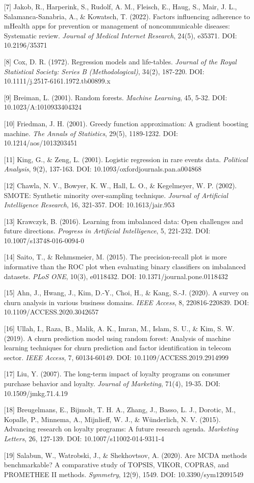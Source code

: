 \documentclass[
  12pt,
]{ctexart}
\begin{document}
{[}7{]} Jakob, R., Harperink, S., Rudolf, A. M., Fleisch, E., Haug, S., Mair, J. L., Salamanca-Sanabria, A., \& Kowatsch, T. (2022). Factors influencing adherence to mHealth apps for prevention or management of noncommunicable diseases: Systematic review. \emph{Journal of Medical Internet Research}, 24(5), e35371. DOI: 10.2196/35371

{[}8{]} Cox, D. R. (1972). Regression models and life-tables. \emph{Journal of the Royal Statistical Society: Series B (Methodological)}, 34(2), 187-220. DOI: 10.1111/j.2517-6161.1972.tb00899.x

{[}9{]} Breiman, L. (2001). Random forests. \emph{Machine Learning}, 45, 5-32. DOI: 10.1023/A:1010933404324

{[}10{]} Friedman, J. H. (2001). Greedy function approximation: A gradient boosting machine. \emph{The Annals of Statistics}, 29(5), 1189-1232. DOI: 10.1214/aos/1013203451

{[}11{]} King, G., \& Zeng, L. (2001). Logistic regression in rare events data. \emph{Political Analysis}, 9(2), 137-163. DOI: 10.1093/oxfordjournals.pan.a004868

{[}12{]} Chawla, N. V., Bowyer, K. W., Hall, L. O., \& Kegelmeyer, W. P. (2002). SMOTE: Synthetic minority over-sampling technique. \emph{Journal of Artificial Intelligence Research}, 16, 321-357. DOI: 10.1613/jair.953

{[}13{]} Krawczyk, B. (2016). Learning from imbalanced data: Open challenges and future directions. \emph{Progress in Artificial Intelligence}, 5, 221-232. DOI: 10.1007/s13748-016-0094-0

{[}14{]} Saito, T., \& Rehmsmeier, M. (2015). The precision-recall plot is more informative than the ROC plot when evaluating binary classifiers on imbalanced datasets. \emph{PLoS ONE}, 10(3), e0118432. DOI: 10.1371/journal.pone.0118432

{[}15{]} Ahn, J., Hwang, J., Kim, D.-Y., Choi, H., \& Kang, S.-J. (2020). A survey on churn analysis in various business domains. \emph{IEEE Access}, 8, 220816-220839. DOI: 10.1109/ACCESS.2020.3042657

{[}16{]} Ullah, I., Raza, B., Malik, A. K., Imran, M., Islam, S. U., \& Kim, S. W. (2019). A churn prediction model using random forest: Analysis of machine learning techniques for churn prediction and factor identification in telecom sector. \emph{IEEE Access}, 7, 60134-60149. DOI: 10.1109/ACCESS.2019.2914999

{[}17{]} Liu, Y. (2007). The long-term impact of loyalty programs on consumer purchase behavior and loyalty. \emph{Journal of Marketing}, 71(4), 19-35. DOI: 10.1509/jmkg.71.4.19

{[}18{]} Breugelmans, E., Bijmolt, T. H. A., Zhang, J., Basso, L. J., Dorotic, M., Kopalle, P., Minnema, A., Mijnlieff, W. J., \& Wünderlich, N. V. (2015). Advancing research on loyalty programs: A future research agenda. \emph{Marketing Letters}, 26, 127-139. DOI: 10.1007/s11002-014-9311-4

{[}19{]} Salabun, W., Watrobski, J., \& Shekhovtsov, A. (2020). Are MCDA methods benchmarkable? A comparative study of TOPSIS, VIKOR, COPRAS, and PROMETHEE II methods. \emph{Symmetry}, 12(9), 1549. DOI: 10.3390/sym12091549
\end{document}

